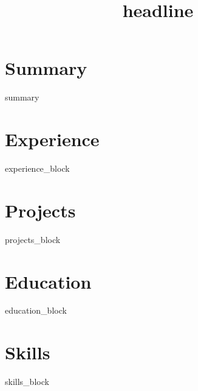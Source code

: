 \documentclass[11pt,a4paper,sans]{moderncv}
\title{{{headline}}}
{{contact_line}}
\begin{document}
\makecvtitle

\section{Summary}
{{summary}}

\section{Experience}
{{experience_block}}

\section{Projects}
{{projects_block}}

\section{Education}
{{education_block}}

\section{Skills}
{{skills_block}}
\end{document}
